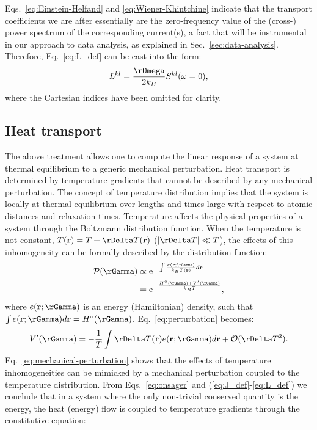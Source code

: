 Eqs.~\eqref{eq:Einstein-Helfand} and \eqref{eq:Wiener-Khintchine} indicate that the transport coefficients we are after essentially are the zero-frequency value of the (cross-) power spectrum of the corresponding current(s), a fact that will be instrumental in our approach to data analysis, as explained in Sec.~\ref{sec:data-analysis}. Therefore, Eq.~\eqref{eq:L_def} can be cast into the form:
\begin{equation}
    L^{kl} =\frac{\rOmega}{2 k_B} S^{kl}(\omega=0), \label{eq:GK-S0}
\end{equation}
where the Cartesian indices have been omitted for clarity.


\subsection{Heat transport}
The above treatment allows one to compute the linear response of a system at thermal equilibrium to a generic mechanical perturbation. Heat transport is determined by temperature gradients that cannot be described by any mechanical perturbation. The concept of temperature distribution implies that the system is locally at thermal equilibrium over lengths and times large with respect to atomic distances and relaxation times. Temperature affects the physical properties of a system through the Boltzmann distribution function. When the temperature is not constant, $T(\mathbf{r})=T+\rDelta T(\mathbf{r})$ ($|\rDelta T| \ll T$), the effects of this inhomogeneity can be formally described by the distribution function:
\begin{align}
  \mathcal{P}(\rGamma) & \propto
  \mathrm{e}^{-\int \frac{e(\mathbf{r};\rGamma)}{k_BT(\mathbf{r})}d\mathbf{r}} \\
  &= \mathrm{e}^{-\frac{H^\circ(\rGamma)+V'(\rGamma)}{k_BT}},
\end{align}
where $e(\mathbf{r};\rGamma)$ is an energy (Hamiltonian) density, such that $\int e(\mathbf{r};\rGamma) d\mathbf{r}= H^\circ(\rGamma)$. Eq.~\eqref{eq:perturbation} becomes:
\begin{equation}
   V'(\rGamma)=-\frac{1}{T}\int\rDelta T(\mathbf{r})e(\mathbf{r};\rGamma) d\mathbf{r} + \mathcal{O}(\rDelta T^2) . \label{eq:mechanical-perturbation}
\end{equation}
Eq.~\eqref{eq:mechanical-perturbation} shows that the effects of temperature inhomogeneities can be mimicked by a mechanical perturbation coupled to the temperature distribution. From Eqs.~\eqref{eq:onsager} and (\ref{eq:J_def}-\ref{eq:L_def}) we conclude that in a system where the only non-trivial conserved quantity is the energy, the heat (energy) flow is coupled to temperature gradients through the constitutive equation:
